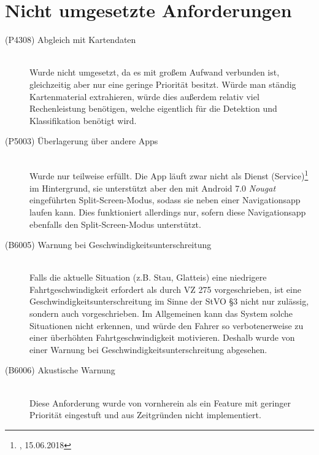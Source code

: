 \documentclass[12pt,a4paper,ngerman,enabledeprecatedfontcommands]{scrreprt}
\begin{document}
\section{Nicht umgesetzte Anforderungen}
\label{nichtumgesetzte-anforderungen}

\begin{description}

\item[(P4308) Abgleich mit Kartendaten]~\\ Wurde nicht umgesetzt, da es mit großem Aufwand verbunden ist, gleichzeitig aber nur eine geringe Priorität besitzt. Würde man ständig Kartenmaterial extrahieren, würde dies außerdem relativ viel Rechenleistung benötigen, welche eigentlich für die \gls{Detektion} und \gls{Klassifikation} benötigt wird.

\item[(P5003) Überlagerung über andere Apps]~\\ Wurde nur teilweise erfüllt. Die \gls{App} läuft zwar nicht als Dienst (Service)\footnote{, 15.06.2018} im Hintergrund, sie unterstützt aber den mit Android 7.0 \textit{Nougat} eingeführten Split-Screen-Modus, sodass sie neben einer Navigationsapp laufen kann. Dies funktioniert allerdings nur, sofern diese Navigationsapp ebenfalls den Split-Screen-Modus unterstützt.

\item[(B6005) Warnung bei Geschwindigkeitsunterschreitung]~\\ Falls die aktuelle Situation (z.B. Stau, Glatteis) eine niedrigere Fahrtgeschwindigkeit erfordert als durch \gls{VZ} 275 vorgeschrieben, ist eine Geschwindigkeitsunterschreitung im Sinne der \gls{StVO} §3 nicht nur zulässig, sondern auch vorgeschrieben. Im Allgemeinen kann das \gls{System} solche Situationen nicht erkennen, und würde den Fahrer so verbotenerweise zu einer überhöhten Fahrtgeschwindigkeit motivieren. Deshalb wurde von einer Warnung bei Geschwindigkeitsunterschreitung abgesehen.

\item[(B6006) Akustische Warnung]~\\ Diese Anforderung wurde von vornherein als ein Feature mit geringer Priorität eingestuft und aus Zeitgründen nicht implementiert.

\end{description}
\end{document}
